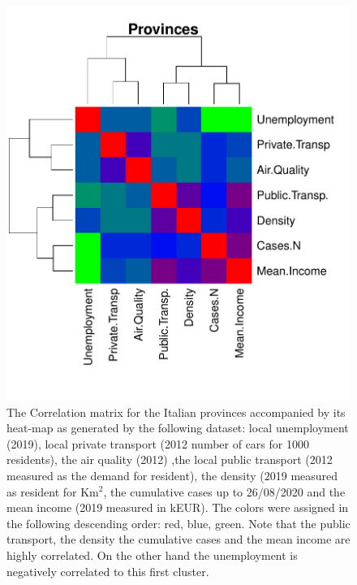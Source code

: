 \documentclass[
12pt, %
a4paper, %
oneside, %
headinclude,footinclude, %
BCOR5mm, %
]{scrartcl}
\begin{document}
\begin{figure}[h]
\begin{center}
\includegraphics[scale=1]{Pic/Province_FULL_CorrMatrix.pdf}
\caption{The Correlation matrix for the Italian provinces accompanied by its heat-map as generated by the following dataset: local unemployment (2019), local private transport (2012 number of cars for 1000 residents), the air quality (2012) ,the local public transport (2012 measured as the demand for resident), the density  (2019 measured as resident for Km$^{2}$, the cumulative cases up to 26/08/2020 and the mean income (2019 measured in kEUR). The colors were assigned in the following descending order: red, blue, green. Note that the public transport, the density the cumulative cases and the mean income are highly correlated. On the other hand the unemployment is negatively correlated to this first cluster. }
\label{Province_corr_matrix}
\end{center}
\end{figure}
\end{document}

